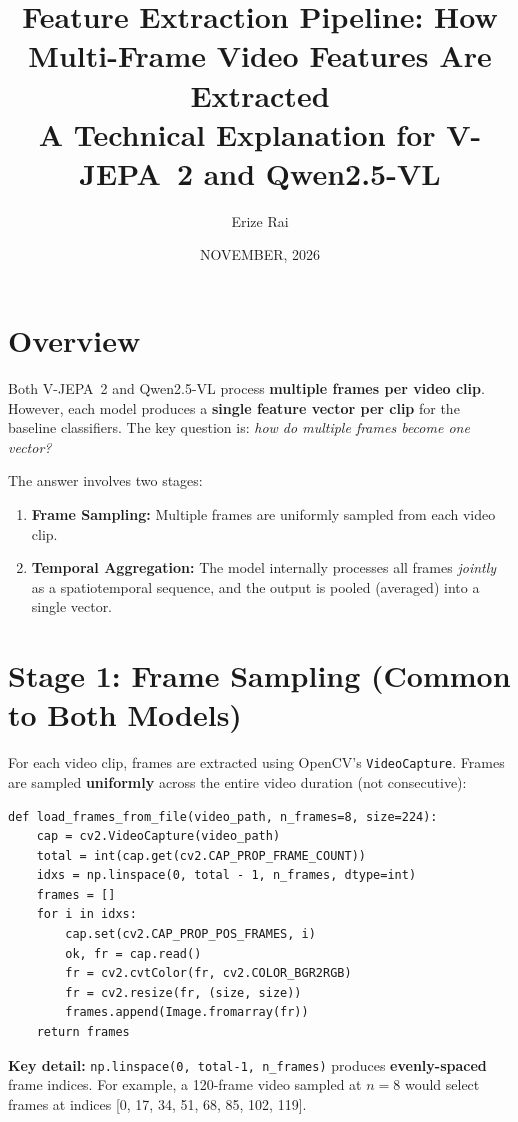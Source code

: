 \documentclass[a4paper, 12pt]{article}
\title{\textbf{Feature Extraction Pipeline: How Multi-Frame Video Features Are Extracted}\\[6pt]
\large A Technical Explanation for V-JEPA~2 and Qwen2.5-VL}
\author{Erize Rai}
\date{NOVEMBER, 2026}
\begin{document}
\maketitle

\section{Overview}

Both V-JEPA~2 and Qwen2.5-VL process \textbf{multiple frames per video clip}. However, each model produces a \textbf{single feature vector per clip} for the baseline classifiers. The key question is: \emph{how do multiple frames become one vector?}

The answer involves two stages:
\begin{enumerate}
    \item \textbf{Frame Sampling:} Multiple frames are uniformly sampled from each video clip.
    \item \textbf{Temporal Aggregation:} The model internally processes all frames \emph{jointly} as a spatiotemporal sequence, and the output is pooled (averaged) into a single vector.
\end{enumerate}

\section{Stage 1: Frame Sampling (Common to Both Models)}

For each video clip, frames are extracted using OpenCV's \texttt{VideoCapture}. Frames are sampled \textbf{uniformly} across the entire video duration (not consecutive):

\begin{lstlisting}
def load_frames_from_file(video_path, n_frames=8, size=224):
    cap = cv2.VideoCapture(video_path)
    total = int(cap.get(cv2.CAP_PROP_FRAME_COUNT))
    idxs = np.linspace(0, total - 1, n_frames, dtype=int)
    frames = []
    for i in idxs:
        cap.set(cv2.CAP_PROP_POS_FRAMES, i)
        ok, fr = cap.read()
        fr = cv2.cvtColor(fr, cv2.COLOR_BGR2RGB)
        fr = cv2.resize(fr, (size, size))
        frames.append(Image.fromarray(fr))
    return frames
\end{lstlisting}

\textbf{Key detail:} \texttt{np.linspace(0, total-1, n\_frames)} produces \textbf{evenly-spaced} frame indices. For example, a 120-frame video sampled at $n=8$ would select frames at indices [0, 17, 34, 51, 68, 85, 102, 119].
\end{document}

